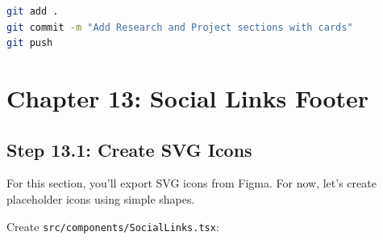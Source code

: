 \documentclass[12pt,a4paper]{article}
\begin{document}
\begin{gitcommit}
\begin{lstlisting}[language=bash]
git add .
git commit -m "Add Research and Project sections with cards"
git push
\end{lstlisting}
\end{gitcommit}

\section{Chapter 13: Social Links Footer}

\subsection{Step 13.1: Create SVG Icons}

For this section, you'll export SVG icons from Figma. For now, let's create placeholder icons using simple shapes.

Create \texttt{src/components/SocialLinks.tsx}:
\end{document}
